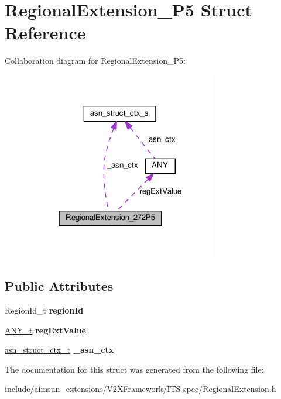\hypertarget{structRegionalExtension__272P5}{}\section{Regional\+Extension\+\_\+P5 Struct Reference}
\label{structRegionalExtension__272P5}


Collaboration diagram for Regional\+Extension\+\_\+P5\+:\nopagebreak
\begin{figure}[H]
\begin{center}
\leavevmode
\includegraphics[width=238pt]{structRegionalExtension__272P5__coll__graph}
\end{center}
\end{figure}
\subsection*{Public Attributes}
\begin{DoxyCompactItemize}
\item 
Region\+Id\+\_\+t {\bfseries region\+Id}\hypertarget{structRegionalExtension__272P5_a18e6aca78ac33bebc108b405469d53b5}{}\label{structRegionalExtension__272P5_a18e6aca78ac33bebc108b405469d53b5}

\item 
\hyperlink{structANY}{A\+N\+Y\+\_\+t} {\bfseries reg\+Ext\+Value}\hypertarget{structRegionalExtension__272P5_ae5e6633e73bf61be70f43317ac6de5e0}{}\label{structRegionalExtension__272P5_ae5e6633e73bf61be70f43317ac6de5e0}

\item 
\hyperlink{structasn__struct__ctx__s}{asn\+\_\+struct\+\_\+ctx\+\_\+t} {\bfseries \+\_\+asn\+\_\+ctx}\hypertarget{structRegionalExtension__272P5_a47edf9c306d1b1cadfa672f8fbd37268}{}\label{structRegionalExtension__272P5_a47edf9c306d1b1cadfa672f8fbd37268}

\end{DoxyCompactItemize}


The documentation for this struct was generated from the following file\+:\begin{DoxyCompactItemize}
\item 
include/aimsun\+\_\+extensions/\+V2\+X\+Framework/\+I\+T\+S-\/spec/Regional\+Extension.\+h\end{DoxyCompactItemize}
